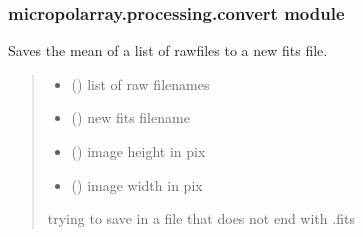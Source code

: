 \documentclass[letterpaper,10pt,english]{sphinxmanual}
\begin{document}
\subsubsection{micropolarray.processing.convert module}
\label{\detokenize{micropolarray.processing:module-micropolarray.processing.convert}}\label{\detokenize{micropolarray.processing:micropolarray-processing-convert-module}}

\begin{fulllineitems}
\label{\detokenize{micropolarray.processing:micropolarray.processing.convert.average_rawfiles_to_fits}}
\pysigstartsignatures
{}
\pysigstopsignatures
\sphinxAtStartPar
Saves the mean of a list of rawfiles to a new fits file.
\begin{quote}\begin{description}
\begin{itemize}
\item {} 
\sphinxAtStartPar
{} () \textendash{} list of raw filenames

\item {} 
\sphinxAtStartPar
{} () \textendash{} new fits filename

\item {} 
\sphinxAtStartPar
{} () \textendash{} image height in pix

\item {} 
\sphinxAtStartPar
{} () \textendash{} image width in pix

\end{itemize}

\sphinxAtStartPar
{} \textendash{} trying to save in a file that does not end with .fits

\end{description}\end{quote}

\end{fulllineitems}
\end{document}
